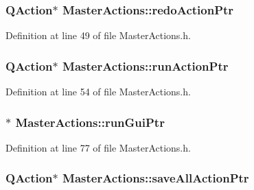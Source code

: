 \hypertarget{class_master_actions_a7936a9bf0e7418cd864b2fb1ab786d09}{
\subsubsection[{redo\-Action\-Ptr}]{\setlength{\rightskip}{0pt plus 5cm}Q\-Action$\ast$ Master\-Actions\-::redo\-Action\-Ptr\hspace{0.3cm}{\ttfamily [private]}}}\label{class_master_actions_a7936a9bf0e7418cd864b2fb1ab786d09}


Definition at line 49 of file Master\-Actions.\-h.

\hypertarget{class_master_actions_a3377fe0ddc45ce50119766c8a903c039}{
\subsubsection[{run\-Action\-Ptr}]{\setlength{\rightskip}{0pt plus 5cm}Q\-Action$\ast$ Master\-Actions\-::run\-Action\-Ptr\hspace{0.3cm}{\ttfamily [private]}}}\label{class_master_actions_a3377fe0ddc45ce50119766c8a903c039}


Definition at line 54 of file Master\-Actions.\-h.

\hypertarget{class_master_actions_ad7ff295f2e3067697e290afc4f0fd0df}{
\subsubsection[{run\-Gui\-Ptr}]{$\ast$ Master\-Actions\-::run\-Gui\-Ptr\hspace{0.3cm}{\ttfamily [private]}}}\label{class_master_actions_ad7ff295f2e3067697e290afc4f0fd0df}


Definition at line 77 of file Master\-Actions.\-h.

\hypertarget{class_master_actions_a4e9bf6410023b508d56f235903a44b5f}{
\subsubsection[{save\-All\-Action\-Ptr}]{\setlength{\rightskip}{0pt plus 5cm}Q\-Action$\ast$ Master\-Actions\-::save\-All\-Action\-Ptr\hspace{0.3cm}{\ttfamily [private]}}}\label{class_master_actions_a4e9bf6410023b508d56f235903a44b5f}


